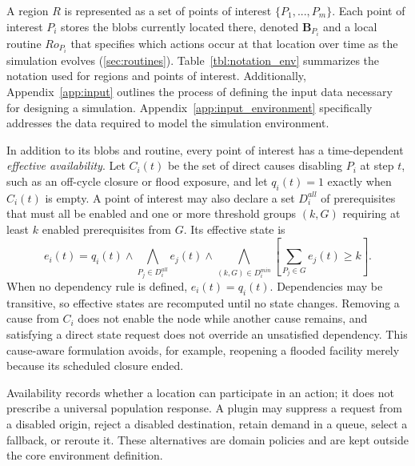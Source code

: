 \documentclass[pdflatex,sn-mathphys-num]{sn-jnl}%
\newcommand\redb[1]{#1}
\theoremstyle{thmstyleone}%
\theoremstyle{thmstyletwo}%
\theoremstyle{thmstylethree}%
\begin{document}
\redb{A region $R$ is represented as a set of points of interest $\{P_1, ..., P_m\}$. Each point of interest $P_i$ stores the blobs currently located there, denoted $\bm{B}_{P_i}$ and a local routine $Ro_{P_i}$
that specifies which actions occur at that location over time as the simulation evolves (\ref{sec:routines}). Table~\ref{tbl:notation_env} summarizes the notation used for regions and points of interest.} 
Additionally, Appendix~\ref{app:input} outlines the process of defining the input data necessary for designing a simulation. Appendix~\ref{app:input_environment} specifically addresses the data required to model the simulation environment.

In addition to its blobs and routine, every point of interest has a time-dependent \textit{effective availability}. Let $C_i(t)$ be the set of direct causes disabling $P_i$ at step $t$, such as an off-cycle closure or flood exposure, and let $q_i(t)=1$ exactly when $C_i(t)$ is empty. A point of interest may also declare a set $D_i^{all}$ of prerequisites that must all be enabled and one or more threshold groups $(k,G)$ requiring at least $k$ enabled prerequisites from $G$. Its effective state is
\begin{equation}
e_i(t)=q_i(t)\land
\bigwedge_{P_j\in D_i^{all}} e_j(t)\land
\bigwedge_{(k,G)\in D_i^{min}}
\left[\sum_{P_j\in G} e_j(t)\geq k\right].
\label{eq:node_availability}
\end{equation}
When no dependency rule is defined, $e_i(t)=q_i(t)$. Dependencies may be transitive, so effective states are recomputed until no state changes. Removing a cause from $C_i$ does not enable the node while another cause remains, and satisfying a direct state request does not override an unsatisfied dependency. This cause-aware formulation avoids, for example, reopening a flooded facility merely because its scheduled closure ended.

Availability records whether a location can participate in an action; it does not prescribe a universal population response. A plugin may suppress a request from a disabled origin, reject a disabled destination, retain demand in a queue, select a fallback, or reroute it. These alternatives are domain policies and are kept outside the core environment definition.


\end{document}
